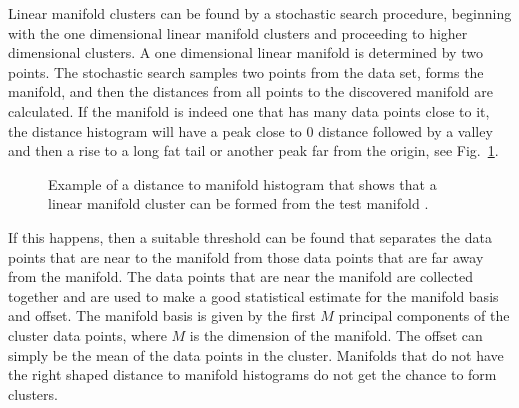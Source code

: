 Linear manifold clusters \cite{Haralick:2007rt} can be found by a stochastic
search procedure, beginning with the one dimensional linear manifold clusters
and proceeding to higher dimensional clusters. A one dimensional linear manifold
is determined by two points. The stochastic search samples two points from
the data set, forms the manifold, and then the distances from all points to the
discovered manifold are calculated. If the manifold is indeed one that has many
data points close to it, the distance histogram will have a peak close to 0
distance followed by a valley and then a rise to a long fat tail or another peak
far from the origin, see Fig.~\ref{fig:dist-hist-sep}.

\begin{figure}[h]
\centering
{}
\caption{Example of a distance to manifold histogram that shows that
a linear manifold cluster can be formed from the test manifold \cite{Haralick:2007rt}.}
\label{fig:dist-hist-sep}
\end{figure}

If this happens, then a suitable threshold can be found that separates
the data points that are near to the manifold from those data points that are
far away from the manifold. The data points that are near the manifold are
collected together and are used to make a good statistical estimate for
the manifold basis and offset. The manifold basis is given by the first
$M$ principal components of the cluster data points, where $M$  is the dimension
of the manifold. The offset can simply be the mean of the data points in
the cluster. Manifolds that do not have the right shaped distance to manifold
histograms do not get the chance to form clusters.

